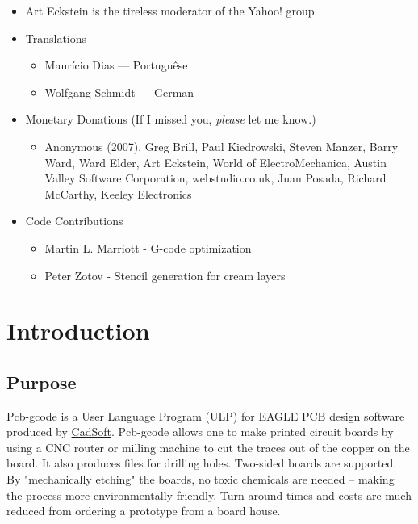 \documentclass[11pt]{book}
\begin{document}
\begin{itemize}
	\item Art Eckstein is the tireless moderator of the Yahoo! group.
	\item Translations
	\begin{itemize}
		\item Maur\'icio Dias --- Portugu\^ese
		\item Wolfgang Schmidt --- German
	\end{itemize}
	\item{Monetary Donations (If I missed you, \emph{please} let me know.) }
	\begin{itemize}
	    \small
		\item Anonymous (2007), Greg Brill, Paul Kiedrowski, Steven Manzer, Barry Ward, Ward Elder, Art Eckstein, World of ElectroMechanica, Austin Valley Software Corporation, webstudio.co.uk, Juan Posada, Richard McCarthy, Keeley Electronics
	\end{itemize}
	\item{Code Contributions}
	    \begin{itemize}
	    \small
	    \item Martin L. Marriott - G-code optimization
	    \item Peter Zotov - Stencil generation for cream layers
	    \end{itemize}
\end{itemize}


\tableofcontents

\listoffigures

\listoftables

\mainmatter

%
\chapter{Introduction}\label{chp:Introduction}
%

%
%
\section{Purpose}\label{sec:Purpose}

Pcb-gcode is a User Language Program (ULP) for EAGLE PCB design software produced by \href{http://cadsoftusa.com}{CadSoft}. Pcb-gcode allows one to make printed circuit boards by using a CNC router or milling machine to cut the traces out of the copper on the board. It also produces files for drilling holes. Two-sided boards are supported. By "mechanically etching" the boards, no toxic chemicals are needed -- making the process more environmentally friendly. Turn-around times and costs are much reduced from ordering a prototype from a board house.
\end{document}
